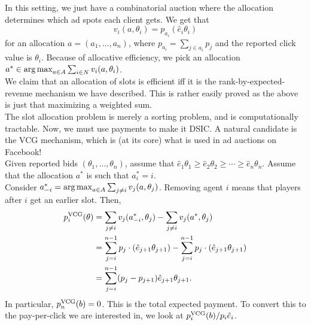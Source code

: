 \begin{fex}
			In this setting, we just have a combinatorial auction where the allocation determines which ad spots each client gets.
			We get that
			\[ v_i(a,\theta_i) = p_{a_i} (\hat{e}_i \theta_i) \]
			for an allocation $a = (a_1,\ldots,a_n)$, where $p_{a_i} = \sum_{j \in a_i} p_j$ and the reported click value is $\theta_i$. Because of allocative efficiency, we pick an allocation $a^* \in \operatorname*{arg\,max}_{a \in A} \sum_{i \in N} v_i(a,\theta_i)$.\\
			We claim that an allocation of slots is efficient iff it is the rank-by-expected-revenue mechanism we have described. This is rather easily proved as the above is just that maximizing a weighted sum.\\
			The slot allocation problem is merely a sorting problem, and is computationally tractable. Now, we must use payments to make it DSIC. A natural candidate is the VCG mechanism, which is (at its core) what is used in ad auctions on Facebook!\\
			Given reported bids $(\theta_1,\ldots,\theta_n)$, assume that $\hat{e}_1 \theta_1 \ge \hat{e}_2 \theta_2 \ge \cdots \ge \hat{e}_n \theta_n$. Assume that the allocation $a^*$ is such that $a_i^* = i$.\\
			Consider $a_{-i}^* = \operatorname*{arg\,max}_{a \in A} \sum_{j \ne i} v_j(a,\theta_j)$. Removing agent $i$ means that players after $i$ get an earlier slot. Then,
			\begin{align*}
				p_i^{\text{VCG}}(\theta) &= \sum_{j \ne i} v_j(a_{-i}^*,\theta_j) - \sum_{j \ne i} v_j(a^*,\theta_j) \\
					&= \sum_{j=i}^{n-1} p_j\cdot (\hat{e}_{j+1} \theta_{j+1}) - \sum_{j = i}^{n-1} p_j\cdot (\hat{e}_{j+1} \theta_{j+1}) \\
					&= \sum_{j=i}^{n-1} (p_j - p_{j+1}) \hat{e}_{j+1} \theta_{j+1}.
			\end{align*}
			In particular, $p_n^{\text{VCG}}(b) = 0$. This is the total expected payment. To convert this to the pay-per-click we are interested in, we look at $p_i^{\text{VCG}}(b)/p_i\hat{e}_i$.
		\end{fex}

